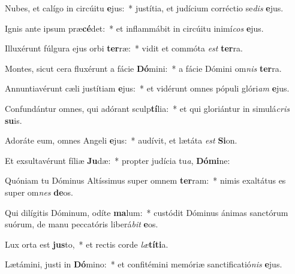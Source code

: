 \item Nubes, et calígo in circúitu \textbf{e}jus:~* justítia, et judícium corréctio se\textit{dis} \textbf{e}jus.
\item Ignis ante ipsum præ\textbf{cé}det:~* et inflammábit in circúitu inimí\textit{cos} \textbf{e}jus.
\item Illuxérunt fúlgura ejus orbi \textbf{ter}ræ:~* vidit et commóta \textit{est} \textbf{ter}ra.
\item Montes, sicut cera fluxérunt a fácie \textbf{Dó}mini:~* a fácie Dómini om\textit{nis} \textbf{ter}ra.
\item Annuntiavérunt cæli justítiam \textbf{e}jus:~* et vidérunt omnes pópuli glóri\textit{am} \textbf{e}jus.
\item Confundántur omnes, qui adórant sculp\textbf{tí}lia:~* et qui gloriántur in simulá\textit{cris} \textbf{su}is.
\item Adoráte eum, omnes Angeli \textbf{e}jus:~* audívit, et lætáta \textit{est} \textbf{Si}on.
\item Et exsultavérunt fíliæ \textbf{Ju}dæ:~* propter judícia tu\textit{a}, \textbf{Dó}\textbf{mi}ne:
\item Quóniam tu Dóminus Altíssimus super omnem \textbf{ter}ram:~* nimis exaltátus es super om\textit{nes} \textbf{de}os.
\item Qui dilígitis Dóminum, odíte \textbf{ma}lum:~* custódit Dóminus ánimas sanctórum suórum, de manu peccatóris liberá\textit{bit} \textbf{e}os.
\item Lux orta est \textbf{jus}to,~* et rectis corde \textit{læ}\textbf{tí}\textbf{ti}a.
\item Lætámini, justi in \textbf{Dó}mino:~* et confitémini memóriæ sanctificatió\textit{nis} \textbf{e}jus.
